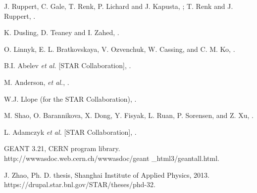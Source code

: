 \documentclass[twocolumn,showpacs,amsmath,amssymb,superscriptaddress,nofootinbib]{revtex4-1}
\begin{document}
\begin{thebibliography}{999}
 J. Ruppert, C. Gale, T. Renk, P. Lichard and J. Kapusta, ; T. Renk and J. Ruppert, .

 K. Dusling, D. Teaney and I. Zahed, .

 O. Linnyk, E. L. Bratkovskaya, V. Ozvenchuk, W. Cassing, and C. M. Ko, .

 B.I. Abelev {\it et al.} [STAR Collaboration], .


 M. Anderson, {\it et al.}, .

 W.J. Llope (for the STAR Collaboration), .





 M. Shao, O. Barannikova, X. Dong, Y. Fisyak, L. Ruan, P. Sorensen, and Z. Xu, .


 L. Adamczyk {\it et al.} [STAR Collaboration], .

GEANT 3.21, CERN program library.
http://wwwasdoc.web.cern.ch/wwwasdoc/geant
\_html3/geantall.html.

 J. Zhao, Ph. D. thesis, Shanghai Institute of Applied Physics, 2013. https://drupal.star.bnl.gov/STAR/theses/phd-32.



\end{thebibliography}
\end{document}
